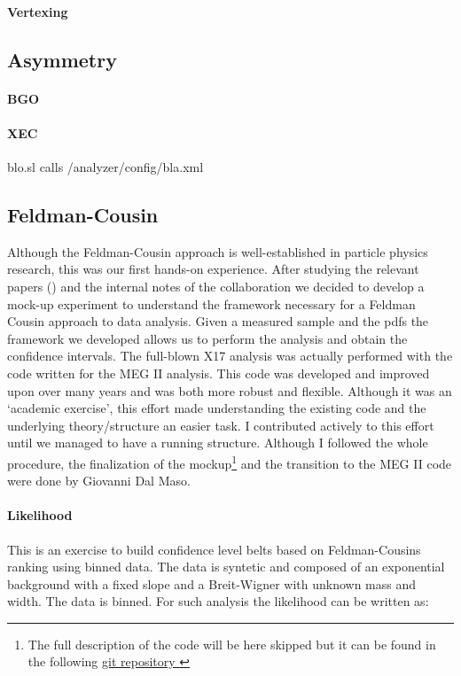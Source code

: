 \begin{refsection}
\paragraph{Vertexing}
\subsection{Asymmetry}
\paragraph{BGO}
\paragraph{XEC}
blo.sl calls /analyzer/config/bla.xml
\subsection{Feldman-Cousin}
Although the Feldman-Cousin approach is well-established in particle physics research, this was our first hands-on experience. 
After studying the relevant papers (\cite{feldman:1998}\cite{feldman:2011}) and the internal notes of the collaboration we decided to develop a mock-up experiment to understand the framework necessary for a Feldman Cousin approach to data analysis.  
Given a measured sample and the pdfs the framework we developed allows us to perform the analysis and obtain the confidence intervals.
The full-blown X17 analysis was actually performed with the code written for the MEG II analysis. This code was developed and improved upon over many years and was both more robust and flexible. 
Although it was an `academic exercise', this effort made understanding the existing code and the underlying theory/structure an easier task.  
I contributed actively to this effort until we managed to have a running structure.
Although I followed the whole procedure, the finalization of the mockup\footnote{ The full description of the code will be here skipped but it can be found in the following 
\href{https://github.com/gdalmaso96/X17_LL_mock_up}{\underline{git repository \faGithubSquare}}} and the transition to the MEG II code were done by Giovanni Dal Maso.

\paragraph{Likelihood}
This is an exercise to build confidence level belts based on Feldman-Cousins ranking using binned data.
The data is syntetic and composed of an exponential background with a fixed slope and a Breit-Wigner with unknown mass and width. The data is binned.
For such analysis the likelihood can be written as:



\end{refsection}
